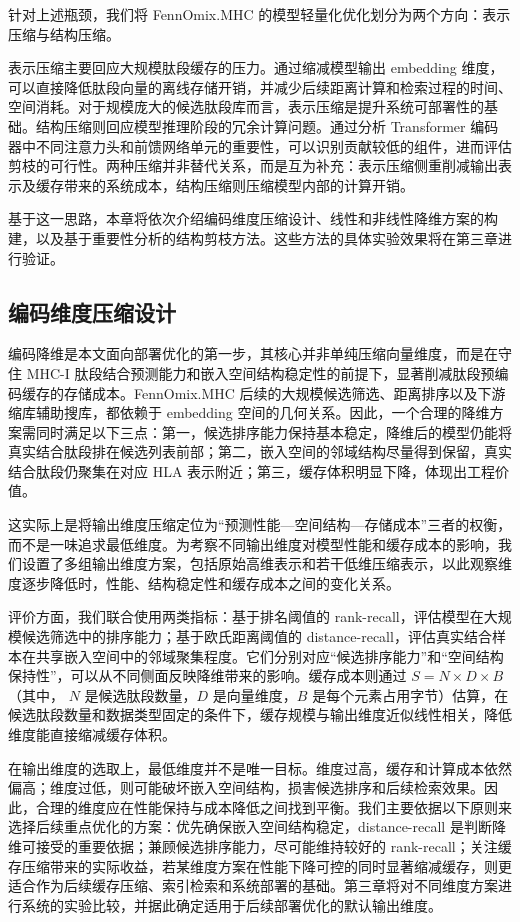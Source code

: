 针对上述瓶颈，我们将 FennOmix.MHC 的模型轻量化优化划分为两个方向：表示压缩与结构压缩。

表示压缩主要回应大规模肽段缓存的压力。通过缩减模型输出 embedding 维度，可以直接降低肽段向量的离线存储开销，并减少后续距离计算和检索过程的时间、空间消耗。对于规模庞大的候选肽段库而言，表示压缩是提升系统可部署性的基础。结构压缩则回应模型推理阶段的冗余计算问题。通过分析 Transformer 编码器中不同注意力头和前馈网络单元的重要性，可以识别贡献较低的组件，进而评估剪枝的可行性。两种压缩并非替代关系，而是互为补充：表示压缩侧重削减输出表示及缓存带来的系统成本，结构压缩则压缩模型内部的计算开销。

基于这一思路，本章将依次介绍编码维度压缩设计、线性和非线性降维方案的构建，以及基于重要性分析的结构剪枝方法。这些方法的具体实验效果将在第三章进行验证。

\subsection{编码维度压缩设计}

编码降维是本文面向部署优化的第一步，其核心并非单纯压缩向量维度，而是在守住 MHC-I 肽段结合预测能力和嵌入空间结构稳定性的前提下，显著削减肽段预编码缓存的存储成本。FennOmix.MHC 后续的大规模候选筛选、距离排序以及下游缩库辅助搜库，都依赖于 embedding 空间的几何关系。因此，一个合理的降维方案需同时满足以下三点：第一，候选排序能力保持基本稳定，降维后的模型仍能将真实结合肽段排在候选列表前部；第二，嵌入空间的邻域结构尽量得到保留，真实结合肽段仍聚集在对应 HLA 表示附近；第三，缓存体积明显下降，体现出工程价值。

这实际上是将输出维度压缩定位为“预测性能—空间结构—存储成本”三者的权衡，而不是一味追求最低维度。为考察不同输出维度对模型性能和缓存成本的影响，我们设置了多组输出维度方案，包括原始高维表示和若干低维压缩表示，以此观察维度逐步降低时，性能、结构稳定性和缓存成本之间的变化关系。

评价方面，我们联合使用两类指标：基于排名阈值的 rank-recall，评估模型在大规模候选筛选中的排序能力；基于欧氏距离阈值的 distance-recall，评估真实结合样本在共享嵌入空间中的邻域聚集程度。它们分别对应“候选排序能力”和“空间结构保持性”，可以从不同侧面反映降维带来的影响。缓存成本则通过 $S = N \times D \times B$ （其中， $N$ 是候选肽段数量，$D$ 是向量维度，$B$ 是每个元素占用字节）估算，在候选肽段数量和数据类型固定的条件下，缓存规模与输出维度近似线性相关，降低维度能直接缩减缓存体积。

在输出维度的选取上，最低维度并不是唯一目标。维度过高，缓存和计算成本依然偏高；维度过低，则可能破坏嵌入空间结构，损害候选排序和后续检索效果。因此，合理的维度应在性能保持与成本降低之间找到平衡。我们主要依据以下原则来选择后续重点优化的方案：优先确保嵌入空间结构稳定，distance-recall 是判断降维可接受的重要依据；兼顾候选排序能力，尽可能维持较好的 rank-recall；关注缓存压缩带来的实际收益，若某维度方案在性能下降可控的同时显著缩减缓存，则更适合作为后续缓存压缩、索引检索和系统部署的基础。第三章将对不同维度方案进行系统的实验比较，并据此确定适用于后续部署优化的默认输出维度。

